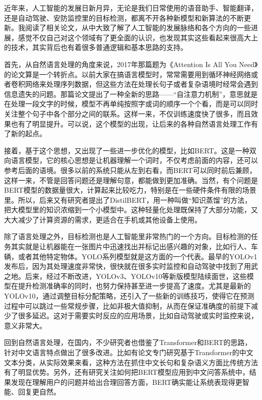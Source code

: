 \documentclass{article}
\begin{document}
\setlength{\parindent}{2em}

近年来，人工智能的发展日新月异，无论是我们日常使用的语音助手、智能翻译，还是自动驾驶、安防监控里的目标检测，都离不开各种新模型和新算法的不断更新。我阅读了相关论文，从中大致了解了人工智能的发展脉络和各个方向的一些进展，感觉不仅自己对这个领域有了更全面的认识，也发现其实这些看起来很高大上的技术，其实背后也有着很多普通逻辑和基本思路的支持。

首先，从自然语言处理的角度来说，2017年那篇题为《Attention Is All You Need》的论文算是一个转折点。以前大家在搞语言模型时，常常需要用到循环神经网络或者卷积网络来处理序列数据，但这些方法在处理长句子或者复杂语境时经常会遇到信息遗失的问题。那篇论文提出了一种全新的思路——“自注意力机制”，意思就是在处理一段文字的时候，模型不再单纯按照字或词的顺序一个个看，而是可以同时关注整个句子中各个部分之间的联系。这样一来，不仅训练速度快了很多，而且效果也有了明显提升。可以说，这个模型的出现，让后来的各种自然语言处理工作有了新的起点。

接着，基于这个思想，又出现了一些进一步优化的模型，比如BERT。这是一种双向语言模型，它的核心思想是让机器理解一个词时，不仅考虑前面的内容，还可以参考后面的语境。很多以前的系统只能从左到右看，而BERT可以同时前后兼顾，这样一来，不管是回答问题还是理解句意，都能做到更加准确。当然，有个问题是BERT模型的数据量很大，计算起来比较吃力，特别是在一些硬件条件有限的场景里。所以，后来又有研究者提出了DistilBERT，用一种叫做“知识蒸馏”的方法，把大模型里的知识浓缩到一个小模型中。这种轻量化处理既保持了大部分功能，又大大减少了计算资源的需求，更适合在手机或其他设备上使用。

除了语言处理之外，目标检测也是人工智能里非常热门的一个方向。目标检测的任务其实就是让机器能在一张图片中迅速找出并标记出感兴趣的对象，比如行人、车辆，或者其他特定物体。YOLO系列模型就是这方面的一个代表。最早的YOLOv1发布后，因为其处理速度非常快，很快就在很多实时监控和自动驾驶中找到了用武之地。后来，经过不断改进，YOLOv3、YOLOv10等新版模型陆续面世，这些模型在提升检测准确率的同时，也努力保持甚至进一步提高了速度。尤其是最新的YOLOv10，通过调整目标分配策略，还引入了一些新的训练技巧，使得它在预测过程中可以跳过一些常规步骤，比如非极大值抑制，从而在保证准确度的前提下减少了很多延迟。这对于需要实时反应的应用场景，比如自动驾驶或实时监控来说，意义非常大。

回到自然语言处理，在国内，不少研究者也借鉴了Transformer和BERT的思路，针对中文语言特点做出了很多改进。比如有论文专门研究基于Transformer的中文文本分类，从实际效果来看，这种方法在抓住中文长句和复杂语义方面比传统方法有了明显优势。另外，还有研究关注如何把BERT模型应用到中文问答系统中，结果发现在理解用户的问题并给出合理回答方面，BERT确实能让系统表现得更智能、回复更自然。
\end{document}
